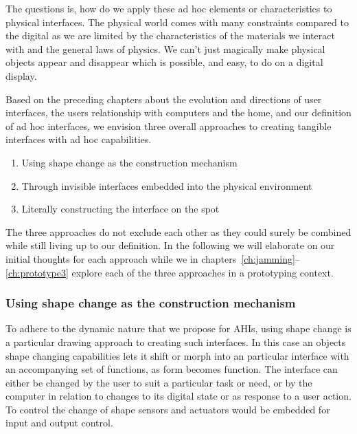 
The questions is, how do we apply these ad hoc elements or characteristics to physical interfaces.
The physical world comes with many constraints compared to the digital as we are limited by the characteristics of the materials we interact with and the general laws of physics.
We can't just magically make physical objects appear and disappear which is possible, and easy, to do on a digital display.

Based on the preceding chapters about the evolution and directions of user interfaces, the users relationship with computers and the home, and our definition of ad hoc interfaces, we envision three overall approaches to creating tangible interfaces with ad hoc capabilities.

\begin{enumerate}
	\item{Using shape change as the construction mechanism }
	\item{Through invisible interfaces embedded into the physical environment }
	\item{Literally constructing the interface on the spot }
\end{enumerate}

The three approaches do not exclude each other as they could surely be combined while still living up to our definition.
In the following we will elaborate on our initial thoughts for each approach while we in chapters~\autoref{ch:jamming}--\ref{ch:prototype3} explore each of the three approaches in a prototyping context.

\subsubsection{Using shape change as the construction mechanism}
To adhere to the dynamic nature that we propose for AHIs, using shape change is a particular drawing approach to creating such interfaces.
In this case an objects shape changing capabilities lets it shift or morph into an particular interface with an accompanying set of functions, as form becomes function.
The interface can either be changed by the user to suit a particular task or need, or by the computer in relation to changes to its digital state or as response to a user action.
To control the change of shape sensors and actuators would be embedded for input and output control.

